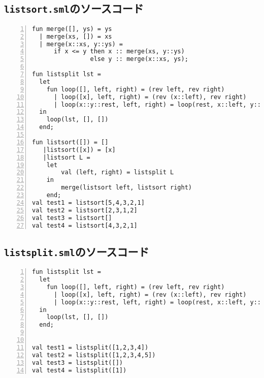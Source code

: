 \documentclass[autodetect-engine,dvi=dvipdfmx,ja=standard,
               a4j,11pt]{bxjsarticle}
\begin{document}
\subsection{\texttt{listsort.sml}のソースコード} \label{listsort_code}
\begin{Verbatim}[numbers=left, xleftmargin=8mm, numbersep=6pt,
    fontsize=\small, baselinestretch=0.8]
fun merge([], ys) = ys
  | merge(xs, []) = xs
  | merge(x::xs, y::ys) =
      if x <= y then x :: merge(xs, y::ys)
                else y :: merge(x::xs, ys);

fun listsplit lst =
  let
    fun loop([], left, right) = (rev left, rev right)
      | loop([x], left, right) = (rev (x::left), rev right)
      | loop(x::y::rest, left, right) = loop(rest, x::left, y::right)
  in
    loop(lst, [], [])
  end;

fun listsort([]) = []
   |listsort([x]) = [x] 
   |listsort L = 
    let 
        val (left, right) = listsplit L
    in
        merge(listsort left, listsort right)
    end;
val test1 = listsort[5,4,3,2,1]
val test2 = listsort[2,3,1,2]
val test3 = listsort[]
val test4 = listsort[4,3,2,1]
\end{Verbatim}
\subsection{\texttt{listsplit.sml}のソースコード} \label{listsplit_code}
\begin{Verbatim}[numbers=left, xleftmargin=8mm, numbersep=6pt,
    fontsize=\small, baselinestretch=0.8]
fun listsplit lst =
  let
    fun loop([], left, right) = (rev left, rev right)
      | loop([x], left, right) = (rev (x::left), rev right)
      | loop(x::y::rest, left, right) = loop(rest, x::left, y::right)
  in
    loop(lst, [], [])
  end;


val test1 = listsplit([1,2,3,4])
val test2 = listsplit([1,2,3,4,5])
val test3 = listsplit([])
val test4 = listsplit([1])
\end{Verbatim}
\end{document}
